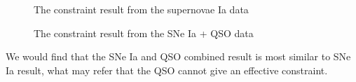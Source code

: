 \documentclass[twocolumn]{aastex631}
\begin{document}
   \begin{figure}[htbp]
      \centering
      \caption{The constraint result from the supernovae
      Ia data}
   \end{figure}

   \begin{figure}[htbp]
      \centering
      \caption{The constraint result from the SNe Ia + QSO data}
   \end{figure}

   We would find that the SNe Ia and QSO combined result is most
   similar to SNe Ia result, what may refer that the QSO cannot
   give an effective constraint.
\end{document}
